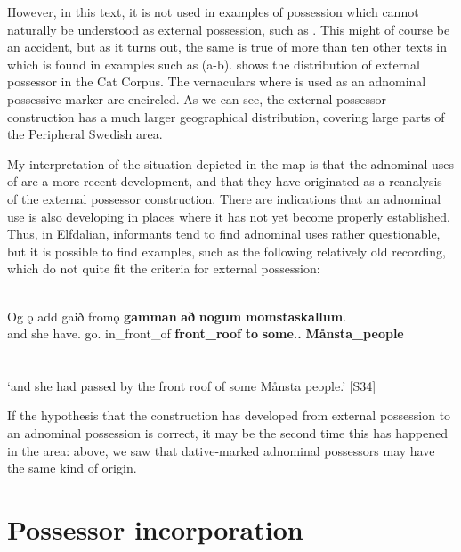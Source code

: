 However, in this text, it is not used in examples of possession which cannot naturally be understood as external possession, such as . This might of course be an accident, but as it turns out, the same is true of more than ten other texts in which  is found in examples such as (a-b).  shows the distribution of external possessor  in the Cat Corpus. The vernaculars where  is used as an adnominal possessive marker are encircled. As we can see, the external possessor construction has a much larger geographical distribution, covering large parts of the Peripheral Swedish area. 

My interpretation of the situation depicted in the map is that the adnominal uses of are a more recent development, and that they have originated as a reanalysis of the external possessor construction. There are indications that an adnominal use is also developing in places where it has not yet become properly established. Thus, in Elfdalian, informants tend to find adnominal uses rather questionable, but it is possible to find examples, such as the following relatively old recording, which do not quite fit the criteria for external possession: 

\ea%
\\
\gll Og  ǫ  add  gaið fromǫ  \textbf{gamman} \textbf{að} \textbf{nogum} \textbf{momstaskallum}.\\
and  she  have.{\pst}  go.{\supp} in\_front\_of   \textbf{front\_roof} \textbf{to} \textbf{some.{}.{\pl}} \textbf{Månsta\_people}\\
\gll\\
\\
\glt ‘and she had passed by the front roof of some Månsta people.’ [S34]
\z

If the hypothesis that the  construction has developed from external possession to an adnominal possession is correct, it may be the second time this has happened in the area: above, we saw that dative-marked adnominal possessors may have the same kind of origin. 

\section{Possessor incorporation}

